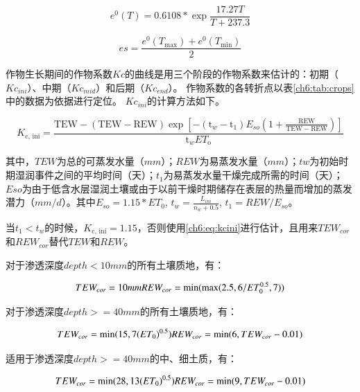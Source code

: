 \begin{equation}
    e^0(T) = 0.6108 * \exp \frac{17.27 T}{T + 237.3}
\end{equation}

\begin{equation}
    es = \frac{e^0(T_{\max}) + e^0(T_{\min})}{2}
\end{equation}

作物生长期间的作物系数$Kc$的曲线是用三个阶段的作物系数来估计的：初期（$Kc_{ini}$）、中期（$Kc_{mid}$）和后期（$Kc_{end}$）。
作物系数的各转折点以表\ref{ch6:tab:crops}中的数据为依据进行定位。
$Kc_{ini}$的计算方法如下\cite{allen1998}。

\begin{equation}
    \label{ch6:eq:kcini}
    K_{\text {c, ini}}=\frac{\mathrm{TEW}-(\mathrm{TEW}-\mathrm{REW}) \exp \left[-\left(\mathrm{t}_w-\mathrm{t}_1\right) E_{so}\left(1+\frac{\mathrm{REW}}{\mathrm{TEW}-\mathrm{REW}}\right)\right]}{\mathrm{t}_w E T_{\mathrm{o}}}
\end{equation}

其中，$TEW$为总的可蒸发水量（$mm$）；$REW$为易蒸发水量（$mm$）；$tw$为初始时期湿润事件之间的平均时间（天）；$t_1$为易蒸发水量干燥完成所需的时间（天）；$Eso$为由于低含水层湿润土壤或由于以前干燥时期储存在表层的热量而增加的蒸发潜力（$mm/d$）。其中$E_{so} = 1.15 * ET_0$, $t_w = \frac{L_{ini}}{n_w + 0.5}$, $t_1 = REW / E_{so}$。

当$t_1 < t_w$的时候，$K_{\text {c, ini}} = 1.15$，否则使用\ref{ch6:eq:kcini}进行估计，且用来$TEW_{cor}$和$REW_{cor}$替代$TEW$和$REW$。

对于渗透深度$depth < 10mm$的所有土壤质地，有：

\begin{equation}
    TEW_{cor} = 10mm \\
    REW_{cor} = \min(\max(2.5, 6 / ET_0^{0.5}, 7))
\end{equation}

对于渗透深度$depth >= 40mm$的所有土壤质地，有：

\begin{equation}
    TEW_{cor} = \min(15, 7 {(ET_0)}^{0.5}) \\
    REW_{cor} = \min(6, TEW_{cor} - 0.01)
\end{equation}

适用于渗透深度$depth >= 40mm$的中、细土质，有：

\begin{equation}
    TEW_{cor} = \min(28, 13{(ET_0)}^{0.5}) \\
    REW_{cor} = \min(9, TEW_{cor} - 0.01)
\end{equation}


